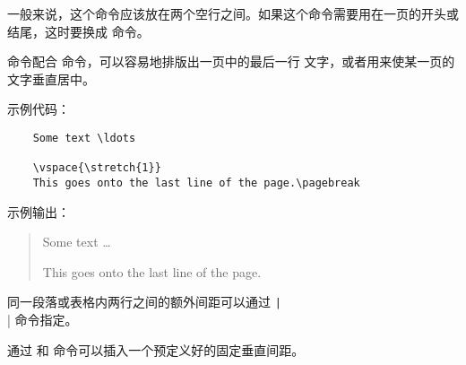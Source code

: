 \documentclass[UTF8]{ctexart}
\begin{document}
一般来说，这个命令应该放在两个空行之间。如果这个命令需要用在一页的开头或结尾，这时要换成
\texttt{\vspace*} 命令。

\texttt{\stretch} 命令配合 \texttt{\pagebreak} 命令，可以容易地排版出一页中的最后一行
文字，或者用来使某一页的文字垂直居中。

示例代码：
\begin{verbatim}
    Some text \ldots

    \vspace{\stretch{1}}
    This goes onto the last line of the page.\pagebreak
\end{verbatim}

示例输出：
\begin{quote}
    Some text \ldots

    This goes onto the last line of the page.\pagebreak
\end{quote}

同一段落或表格内两行之间的额外间距可以通过 \texttt|\\[length]| 命令指定。

通过 \texttt{\bigskip} 和 \texttt{\smallskip} 命令可以插入一个预定义好的固定垂直间距。
\end{document}
